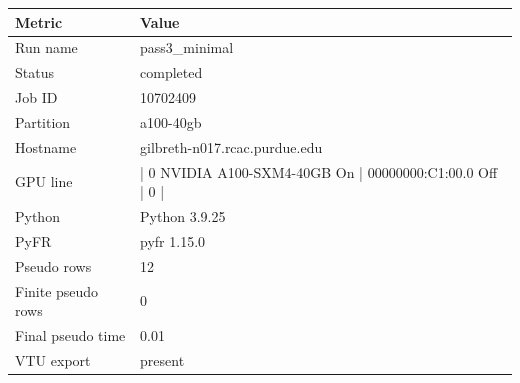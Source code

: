 \begin{tabular}{ll}
\toprule
Metric & Value\\
\midrule
Run name & pass3\_minimal\\
Status & completed\\
Job ID & 10702409\\
Partition & a100-40gb\\
Hostname & gilbreth-n017.rcac.purdue.edu\\
GPU line & |   0  NVIDIA A100-SXM4-40GB          On  |   00000000:C1:00.0 Off |                    0 |\\
Python & Python 3.9.25\\
PyFR & pyfr 1.15.0\\
Pseudo rows & 12\\
Finite pseudo rows & 0\\
Final pseudo time & 0.01\\
VTU export & present\\
\bottomrule
\end{tabular}
